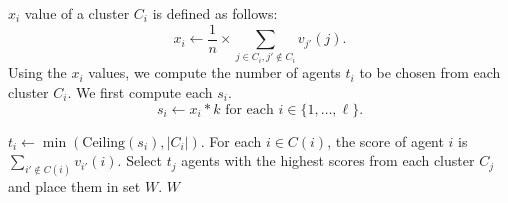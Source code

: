 \documentclass[letterpaper]{article}
\begin{document}
\begin{algorithm}[ht!]
\begin{algorithmic}[1]
		 \STATE $x_i$ value of a cluster $C_i$ is defined as follows:
			 \[x_i\longleftarrow \frac{1}{n} \times \sum_{j\in C_i, j'\notin C_i}v_{j'}(j).\]
			 \STATE Using the $x_i$ values, we compute the number of agents $t_i$ to be chosen from each cluster $C_i$. We first compute each $s_i$.
 \[s_i\longleftarrow x_i * k \text{ for each } i\in \{1,\ldots, \ell\}.\]


			 			 \STATE $t_i \longleftarrow \min(\text{Ceiling}{(s_i)}, |C_i|)$.
			 			 \ENDFOR
				\STATE For each $i\in C(i)$, the score of agent $i$ is
				 $\sum_{i'\notin C(i)}v_{i'}(i).$
				 \STATE Select $t_j$ agents with the highest scores from each cluster $C_j$ and place them in set $W$.
			\RETURN $W$
		 \end{algorithmic}
		\end{algorithm}
\end{document}
